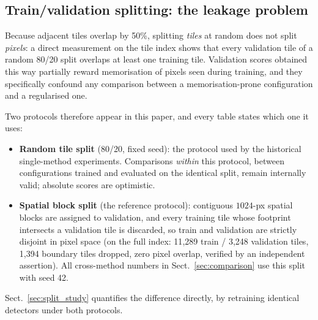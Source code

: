 \begin{table}[htbp]
\centering
\caption{Per-class positive-pixel prevalence over the full dataset (15{,}931 tiles, $1.04\times10^9$ pixels per channel). The prevalence is also the AP of an uninformative (chance-level) predictor for that class.}
\label{tab:prevalence}
\end{table}

\subsection{Train/validation splitting: the leakage problem}
\label{sec:splits}

Because adjacent tiles overlap by 50\%, splitting \emph{tiles} at random does not split \emph{pixels}: a direct measurement on the tile index shows that every validation tile of a random 80/20 split overlaps at least one training tile. Validation scores obtained this way partially reward memorisation of pixels seen during training, and they specifically confound any comparison between a memorisation-prone configuration and a regularised one.

Two protocols therefore appear in this paper, and every table states which one it uses:
\begin{itemize}
    \item \textbf{Random tile split} (80/20, fixed seed): the protocol used by the historical single-method experiments. Comparisons \emph{within} this protocol, between configurations trained and evaluated on the identical split, remain internally valid; absolute scores are optimistic.
    \item \textbf{Spatial block split} (the reference protocol): contiguous $1024$-px spatial blocks are assigned to validation, and every training tile whose footprint intersects a validation tile is discarded, so train and validation are strictly disjoint in pixel space (on the full index: 11{,}289 train / 3{,}248 validation tiles, 1{,}394 boundary tiles dropped, zero pixel overlap, verified by an independent assertion). All cross-method numbers in Sect.~\ref{sec:comparison} use this split with seed 42.
\end{itemize}
Sect.~\ref{sec:split_study} quantifies the difference directly, by retraining identical detectors under both protocols.

